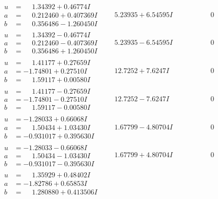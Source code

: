 \documentclass[1p]{elsarticle_modified}
\theoremstyle{definition}
\begin{document}
$$\begin{array}{c|c|c}
\begin{aligned}
u &= \phantom{-}1.34392 + 0.46774 I \\
a &= \phantom{-}0.212460 + 0.407369 I \\
b &= \phantom{-}0.356486 - 1.260450 I\end{aligned}
 & \phantom{-}5.23935 + 6.54595 I & \phantom{-0.000000 } 0 \\ \hline\begin{aligned}
u &= \phantom{-}1.34392 - 0.46774 I \\
a &= \phantom{-}0.212460 - 0.407369 I \\
b &= \phantom{-}0.356486 + 1.260450 I\end{aligned}
 & \phantom{-}5.23935 - 6.54595 I & \phantom{-0.000000 } 0 \\ \hline\begin{aligned}
u &= \phantom{-}1.41177 + 0.27659 I \\
a &= -1.74801 + 0.27510 I \\
b &= \phantom{-}1.59117 + 0.00580 I\end{aligned}
 & \phantom{-}12.7252 + 7.6247 I & \phantom{-0.000000 } 0 \\ \hline\begin{aligned}
u &= \phantom{-}1.41177 - 0.27659 I \\
a &= -1.74801 - 0.27510 I \\
b &= \phantom{-}1.59117 - 0.00580 I\end{aligned}
 & \phantom{-}12.7252 - 7.6247 I & \phantom{-0.000000 } 0 \\ \hline\begin{aligned}
u &= -1.28033 + 0.66068 I \\
a &= \phantom{-}1.50434 + 1.03430 I \\
b &= -0.931017 + 0.395630 I\end{aligned}
 & \phantom{-}1.67799 - 4.80704 I & \phantom{-0.000000 } 0 \\ \hline\begin{aligned}
u &= -1.28033 - 0.66068 I \\
a &= \phantom{-}1.50434 - 1.03430 I \\
b &= -0.931017 - 0.395630 I\end{aligned}
 & \phantom{-}1.67799 + 4.80704 I & \phantom{-0.000000 } 0 \\ \hline\begin{aligned}
u &= \phantom{-}1.35929 + 0.48402 I \\
a &= -1.82786 + 0.65853 I \\
b &= \phantom{-}1.280880 + 0.413506 I\end{aligned}

\end{array}$$
\end{document}
